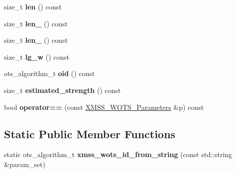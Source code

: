 \begin{DoxyCompactItemize}
\item 
\mbox{\label{class_botan_1_1_x_m_s_s___w_o_t_s___parameters_ab51271c681946048cafb71fa29d86b31}} 
size\+\_\+t {\bfseries len} () const
\item 
\mbox{\label{class_botan_1_1_x_m_s_s___w_o_t_s___parameters_a2b3177d186feacaa12bb8f72a88ac971}} 
size\+\_\+t {\bfseries len\+\_} () const
\item 
\mbox{\label{class_botan_1_1_x_m_s_s___w_o_t_s___parameters_a008bf71408eebbd39f282df0ff0c816d}} 
size\+\_\+t {\bfseries len\+\_} () const
\item 
\mbox{\label{class_botan_1_1_x_m_s_s___w_o_t_s___parameters_ad0418aae7bcd69d71f7444d9d6824d3a}} 
size\+\_\+t {\bfseries lg\+\_\+w} () const
\item 
\mbox{\label{class_botan_1_1_x_m_s_s___w_o_t_s___parameters_a8edc4cb8a1664deb7bfb99de71ff132c}} 
ots\+\_\+algorithm\+\_\+t {\bfseries oid} () const
\item 
\mbox{\label{class_botan_1_1_x_m_s_s___w_o_t_s___parameters_aa1ee31abc2eb95e14e5a68293141ca0c}} 
size\+\_\+t {\bfseries estimated\+\_\+strength} () const
\item 
\mbox{\label{class_botan_1_1_x_m_s_s___w_o_t_s___parameters_aef4a3e78fc89d9ec1ee8a5756cec938b}} 
bool {\bfseries operator==} (const \hyperlink{class_botan_1_1_x_m_s_s___w_o_t_s___parameters}{X\+M\+S\+S\+\_\+\+W\+O\+T\+S\+\_\+\+Parameters} \&p) const
\end{DoxyCompactItemize}
\subsection*{Static Public Member Functions}
\begin{DoxyCompactItemize}
\item 
\mbox{\label{class_botan_1_1_x_m_s_s___w_o_t_s___parameters_ab7eee862a3cfb47cdb7fae61d9fc2bc7}} 
static ots\+\_\+algorithm\+\_\+t {\bfseries xmss\+\_\+wots\+\_\+id\+\_\+from\+\_\+string} (const std\+::string \&param\+\_\+set)
\end{DoxyCompactItemize}


